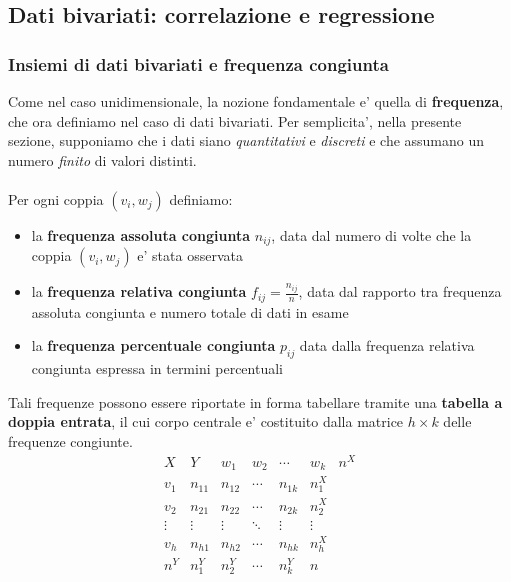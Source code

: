 \documentclass[a4paper,12pt]{article}
\begin{document}
\subsection{Dati bivariati: correlazione e regressione}
\subsubsection{Insiemi di dati bivariati e frequenza congiunta}
Come nel caso unidimensionale, la nozione fondamentale e' quella di \textbf{frequenza}, che ora
definiamo nel caso di dati bivariati. Per semplicita', nella presente sezione, supponiamo
che i dati siano \textit{quantitativi} e \textit{discreti} e che assumano un numero \textit{finito} di valori distinti.\\
\vspace{1px}\\
Per ogni coppia $(v_i, w_j)$ definiamo:
\begin{itemize}
  \item la \textbf{frequenza assoluta congiunta} $n_{ij}$, data dal numero di volte che la coppia $(v_i, w_j)$ e' stata osservata
  \item la \textbf{frequenza relativa congiunta} $f_{ij}=\frac{n_{ij}}{n}$, data dal rapporto tra frequenza assoluta congiunta e numero totale di dati in esame
  \item la \textbf{frequenza percentuale congiunta} $p_{ij}$ data dalla frequenza relativa congiunta espressa in termini percentuali
\end{itemize}
Tali frequenze possono essere riportate in forma tabellare tramite una \textbf{tabella a doppia entrata}, il cui corpo centrale e' costituito dalla matrice $h \times k$ delle frequenze congiunte.
\[
\begin{array}{c|ccccc|c}
X & Y & w_1 & w_2 & \cdots & w_k & n^X \\
\hline
v_1 & n_{11} & n_{12} & \cdots & n_{1k} & n_1^X \\
v_2 & n_{21} & n_{22} & \cdots & n_{2k} & n_2^X \\
\vdots & \vdots & \vdots & \ddots & \vdots & \vdots \\
v_h & n_{h1} & n_{h2} & \cdots & n_{hk} & n_h^X \\
\hline
n^Y & n_1^Y & n_2^Y & \cdots & n_k^Y & n
\end{array}
\]
\end{document}
